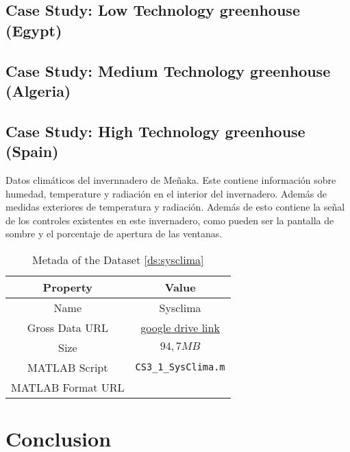 \documentclass{article}
\begin{document}
    \subsection{Case Study: Low Technology greenhouse (Egypt)}
    \subsection{Case Study: Medium Technology greenhouse (Algeria)}
    \subsection{Case Study: High Technology greenhouse (Spain)}

    \begin{dataset}[sysclima]\label{ds:sysclima}
        Datos climáticos del invernnadero de Meñaka. Este contiene información sobre humedad, temperature y radiación en el interior del invernadero. Además de medidas exteriores de temperatura y radiación. Además de esto contiene la señal de los controles existentes en este invernadero, como pueden ser la pantalla de sombre y el porcentaje de apertura de las ventanas. 

        \begin{table}[ht!]
            \centering
            \begin{tabular}{|c|c|}
                \hline 
                \textbf{Property} & \textbf{Value} \\ \hline \hline 
                Name & Sysclima \\ 
                Gross Data URL & \href{https://drive.google.com/u/0/uc?id=1ntcuCD2Kbu32FaNiSWqP80BOhgNPl-Z_&export=download}
                {google drive link}  \\
                Size & $94,7 MB$ \\ 
                MATLAB Script & \texttt{CS3\_1\_SysClima.m}\\  
                MATLAB Format URL & 
            \end{tabular}
            \caption{Metada of the Dataset \ref{ds:sysclima}}
        \end{table}
    \end{dataset} 
    \section{Conclusion}
\end{document}
